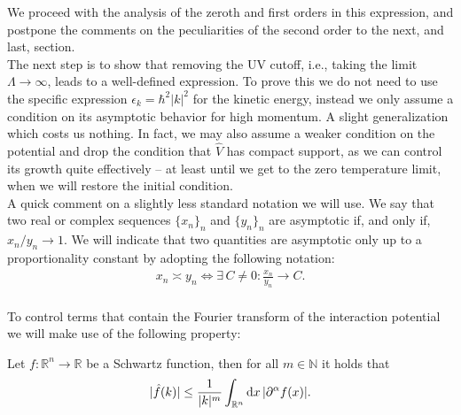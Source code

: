 We proceed with the analysis of the zeroth and first orders in this expression, and postpone
the comments on the peculiarities of the second order to the next, and last, section.
\\
The next step is to show that removing the UV cutoff, i.e., taking the limit
$\Lambda\to\infty$, leads to a well-defined expression. To prove this we do not need to use
the specific expression $\epsilon_k=\hbar^2|k|^2$ for the kinetic energy, instead we only
assume a condition on its asymptotic behavior for high momentum. A slight generalization
which costs us nothing. In fact, we may also assume a weaker condition on the potential and
drop the condition that $\hat{V}$ has compact support, as we can control its growth quite
effectively -- at least until we get to the zero temperature limit, when we will restore the
initial condition.
\\
A quick comment on a slightly less standard notation we will use. We say that two real or
complex sequences $\{x_n\}_n$ and $\{y_n\}_n$ are asymptotic if, and only if, $x_n/y_n
\longrightarrow 1$. We will indicate that two quantities are asymptotic only up to a
proportionality constant by adopting the following notation:
\begin{align*}
	x_n \asymp y_n \iff \exists\, C\neq0 : \frac{x_n}{y_n} \longrightarrow C.
\end{align*}
\\
To control terms that contain the Fourier transform of the interaction potential we will make
use of the following property:
\begin{lemma}
	\label{fourier-decay}
	Let $f:\mathbb{R}^n\to\mathbb{R}$ be a Schwartz function, then for all $m\in\mathbb{N}$
	it holds that
	\begin{align*}
		\vert \hat{f}(k)\vert \leq \frac{1}{\vert k\vert^m}
			\int_{\mathbb{R}^n}\mathrm{d} x\,\vert \partial^\alpha f(x)\vert.
	\end{align*}
\end{lemma}
